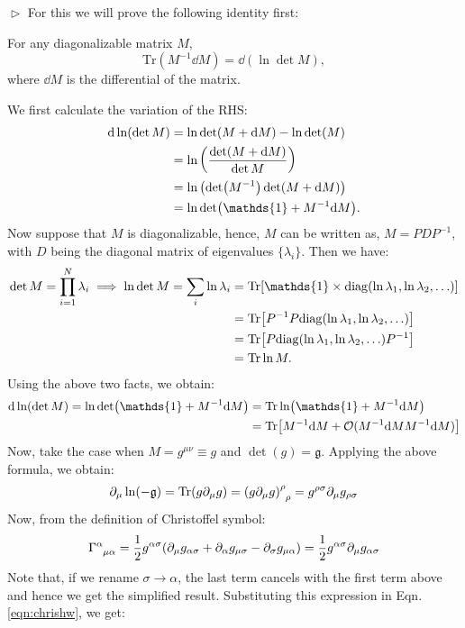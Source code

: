 $\vartriangleright$ For this we will prove the following identity first:
\begin{identity}
For any diagonalizable matrix $M$, 
\[
\mathrm{Tr}(M^{-1} \dd M) = \dd(\ln \det M),
\]
where $\dd M$ is the differential of the matrix. 
\end{identity}
We first calculate the variation of the RHS:
\begin{align*}
    \dd \ln(\det M) &= \ln \det(M+\dd M) - \ln \det(M)\\
&= \ln \left( \frac{\det(M+\dd M)}{\det M} \right)\\
&= \ln \qty(\det(M^{-1})\det(M+\dd M))\\
&= \ln \det\bigl(\mathds{1} + M^{-1} \dd M \bigr).
\end{align*}
Now suppose that $M$ is diagonalizable, hence, $M$ can be written as, $M = P D P^{-1}$, with $D$ being the diagonal matrix of eigenvalues $\{\lambda_i\}$. Then we have:  
\begin{align*}
    \det M = \prod_{i=1}^N \lambda_i \implies  \ln \det M = \sum_i \ln \lambda_i &= \Tr[ \mathds{1}\times \mathrm{diag} (\ln \lambda_1,\ln \lambda_2,\ldots)]\\ &=\Tr[P ^{-1}P \mathrm{diag}  (\ln \lambda_1,\ln \lambda_2,\ldots)]\\ &=\Tr [ P \mathrm{diag}(\ln \lambda_1,\ln \lambda_2,\ldots)P ^{-1}] \\ &= \Tr \ln M   .
\end{align*}
Using the above two facts, we obtain:
\begin{align*}
     \dd \ln(\det M) =  \ln \det\bigl(\mathds{1} + M^{-1} \dd M \bigr) &= \Tr \ln (\mathds{1} + M^{-1} \dd M)\\
     &=\Tr[M^{-1} \dd M +\mathcal{O}(M^{-1} \dd M M^{-1} \dd M) ]
\end{align*}
Now, take the case when $M = g^{\mu\nu}\equiv g$ and $\det(g) = \mathfrak{g}$. Applying the above formula, we obtain:
\begin{align}\label{eqn:chrishw}
    \partial_\mu \ln (-\detg)  = \Tr (g \partial_\mu g) = \tensor{{(g \partial_\mu g)}}{^\rho _\rho} = g^{\rho\sigma} \partial_\mu g_{\rho\sigma}
\end{align}
Now, from the definition of Christoffel symbol:
\[
\chris{\alpha}{\mu}{\alpha} = \frac{1}{2}g^{\alpha\sigma}\qty(\partial_\mu g_{\alpha\sigma} +\partial_\alpha g_{\mu\sigma} -\partial_\sigma g_{\mu\alpha})  = \frac{1}{2}g^{\alpha\sigma}\partial_\mu g_{\alpha\sigma} 
\]
Note that, if we rename $\sigma \to \alpha$, the last term cancels with the first term above and hence we get the simplified result. Substituting this expression in Eqn. \ref{eqn:chrishw}, we get:
